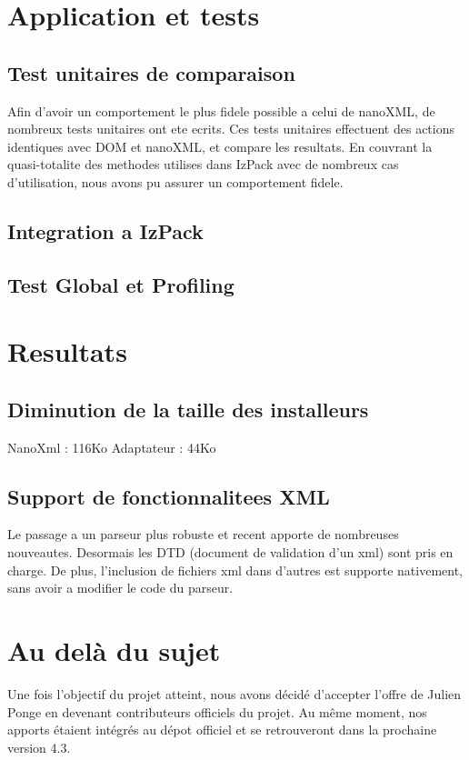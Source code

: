 \begin{description}
\section{Application et tests}
\subsection{Test unitaires de comparaison}
Afin d'avoir un comportement le plus fidele possible a celui de nanoXML, de nombreux tests unitaires ont ete ecrits.
Ces tests unitaires effectuent des actions identiques avec DOM et nanoXML, et compare les resultats.
En couvrant la quasi-totalite des methodes utilises dans IzPack avec de nombreux cas d'utilisation, nous avons pu assurer un comportement fidele.
\subsection{Integration a IzPack}
\subsection{Test Global et Profiling}

\section{Resultats}
\subsection{Diminution de la taille des installeurs}
NanoXml : 116Ko
Adaptateur : 44Ko
\subsection{Support de fonctionnalitees XML}
Le passage a un parseur plus robuste et recent apporte de nombreuses nouveautes.
Desormais les DTD (document de validation d'un xml) sont pris en charge.
De plus, l'inclusion de fichiers xml dans d'autres est supporte nativement, sans avoir a modifier le code du parseur.

\section{Au delà du sujet}
Une fois l'objectif du projet atteint, nous avons décidé d'accepter l'offre de Julien Ponge en devenant contributeurs officiels du projet. Au même moment, nos apports étaient intégrés au dépot officiel et se retrouveront dans la prochaine version 4.3.


\end{description}

